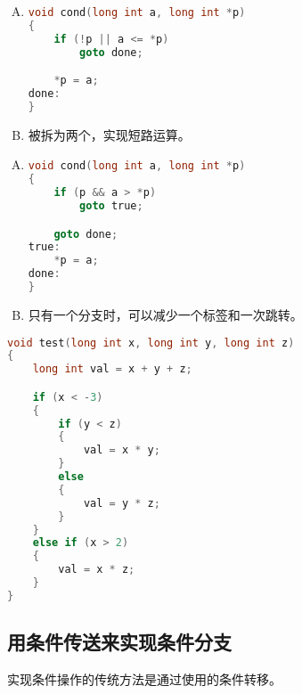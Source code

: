 {{        %
        \begin{practicec}
            \begin{enumerate}[A.]
                \item
                {
                    \begin{lstlisting}[language=C]
void cond(long int a, long int *p)
{
    if (!p || a <= *p)
        goto done;

    *p = a;
done:
}
                    \end{lstlisting}
                }
                \item
                {
                    \emcode{\&\&}被拆为两个，实现短路运算。
                }
            \end{enumerate}
        \end{practicec}

        \begin{practicec}
            \begin{enumerate}[A.]
                \item
                {
                    \begin{lstlisting}[language=C]
void cond(long int a, long int *p)
{
    if (p && a > *p)
        goto true;

    goto done;
true:
    *p = a;
done:
}
                    \end{lstlisting}
                }
                \item
                {
                    只有一个分支时，可以减少一个标签和一次跳转。
                }
            \end{enumerate}
        \end{practicec}

        \begin{practicec}
            \begin{lstlisting}[language=C]
void test(long int x, long int y, long int z)
{
    long int val = x + y + z;

    if (x < -3)
    {
        if (y < z)
        {
            val = x * y;
        }
        else
        {
            val = y * z;
        }
    }
    else if (x > 2)
    {
        val = x * z;
    }
}
            \end{lstlisting}
        \end{practicec}
    }

    \subsection{用条件传送来实现条件分支}
    {
        实现条件操作的传统方法是通过使用的条件转移。

}}
